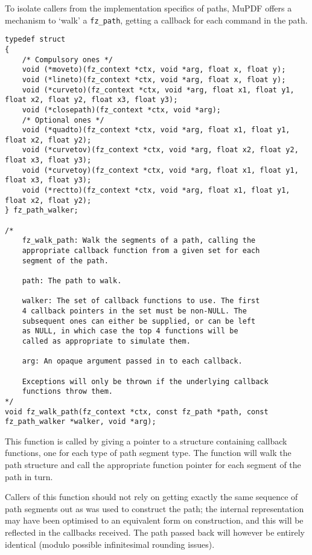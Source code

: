 \documentclass[oneside]{book}
\begin{document}
To isolate callers from the implementation specifics of paths, MuPDF offers a mechanism to `walk' a \texttt{fz\_path}, getting a callback for each command in the path.

\begin{lstlisting}
typedef struct
{
	/* Compulsory ones */
	void (*moveto)(fz_context *ctx, void *arg, float x, float y);
	void (*lineto)(fz_context *ctx, void *arg, float x, float y);
	void (*curveto)(fz_context *ctx, void *arg, float x1, float y1, float x2, float y2, float x3, float y3);
	void (*closepath)(fz_context *ctx, void *arg);
	/* Optional ones */
	void (*quadto)(fz_context *ctx, void *arg, float x1, float y1, float x2, float y2);
	void (*curvetov)(fz_context *ctx, void *arg, float x2, float y2, float x3, float y3);
	void (*curvetoy)(fz_context *ctx, void *arg, float x1, float y1, float x3, float y3);
	void (*rectto)(fz_context *ctx, void *arg, float x1, float y1, float x2, float y2);
} fz_path_walker;

/*
	fz_walk_path: Walk the segments of a path, calling the
	appropriate callback function from a given set for each
	segment of the path.

	path: The path to walk.

	walker: The set of callback functions to use. The first
	4 callback pointers in the set must be non-NULL. The
	subsequent ones can either be supplied, or can be left
	as NULL, in which case the top 4 functions will be
	called as appropriate to simulate them.

	arg: An opaque argument passed in to each callback.

	Exceptions will only be thrown if the underlying callback
	functions throw them.
*/
void fz_walk_path(fz_context *ctx, const fz_path *path, const fz_path_walker *walker, void *arg);
\end{lstlisting}

This function is called by giving a pointer to a structure containing callback functions, one for each type of path segment type. The function will walk the path structure and call the appropriate function pointer for each segment of the path in turn.

Callers of this function should not rely on getting exactly the same sequence of path segments out as was used to construct the path; the internal representation may have been optimised to an equivalent form on construction, and this will be reflected in the callbacks received. The path passed back will however be entirely identical (modulo possible infinitesimal rounding issues).
\end{document}
